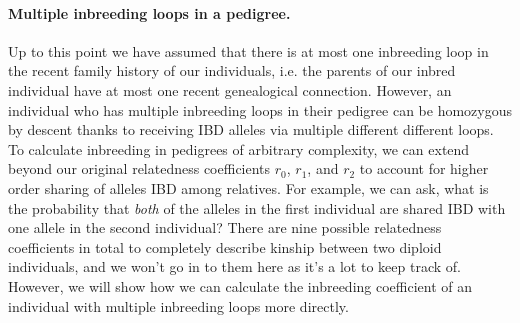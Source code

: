 {{\paragraph{Multiple inbreeding loops in a pedigree.}
Up to this point we have assumed that there is at most one inbreeding loop in the recent family history of our
  individuals, i.e. the parents of our inbred individual have at most one recent genealogical connection. However, an individual who has multiple inbreeding loops in their pedigree can be homozygous by
  descent thanks to receiving IBD alleles via multiple different different loops. To calculate inbreeding in pedigrees of arbitrary complexity, we can extend
 beyond our original relatedness coefficients $r_0$, $r_1$, and $r_2$ to account for
 higher order sharing of alleles IBD among relatives. For example,
 we can ask, what is the probability that \textit{both} of the alleles in the first individual
 are shared IBD with one allele in the second individual? There are
 nine possible relatedness coefficients in total to completely describe kinship between two diploid individuals, and we won't go in to them here
 as it's a lot to keep track of.
However, we will show how we can calculate the inbreeding coefficient of an
individual with multiple inbreeding loops more directly.\\


}}
